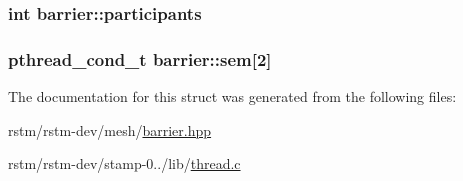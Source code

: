 \hypertarget{classbarrier_a870a87757059cdc49f2a39a79d899ca1}{
\subsubsection[{participants}]{\setlength{\rightskip}{0pt plus 5cm}int barrier\-::participants\hspace{0.3cm}{\ttfamily [private]}}}\label{classbarrier_a870a87757059cdc49f2a39a79d899ca1}
\hypertarget{classbarrier_aefd489a0fce3cc817a4f5436106a3ab5}{
\subsubsection[{sem}]{\setlength{\rightskip}{0pt plus 5cm}pthread\-\_\-cond\-\_\-t barrier\-::sem\mbox{[}2\mbox{]}\hspace{0.3cm}{\ttfamily [private]}}}\label{classbarrier_aefd489a0fce3cc817a4f5436106a3ab5}


The documentation for this struct was generated from the following files\-:\begin{DoxyCompactItemize}
\item 
rstm/rstm-\/dev/mesh/\hyperlink{barrier_8hpp}{barrier.\-hpp}\item 
rstm/rstm-\/dev/stamp-\/0../lib/\hyperlink{thread_8c}{thread.\-c}\end{DoxyCompactItemize}

